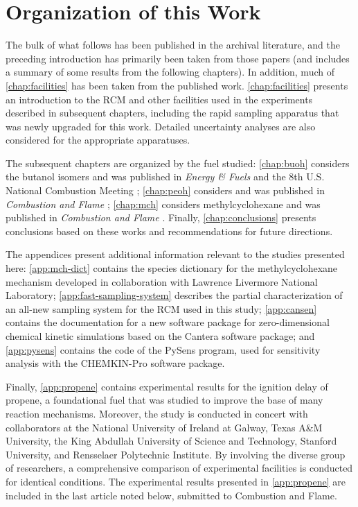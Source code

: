 \documentclass[../main.tex]{subfiles}
\begin{document}
\section{Organization of this Work}

The bulk of what follows has been published in the archival literature,
and the preceding introduction has primarily been taken from those
papers (and includes a summary of some results from the following
chapters). In addition, much of \cref{chap:facilities} has been
taken from the published work. \cref{chap:facilities} presents an
introduction to the RCM and other facilities used in the experiments
described in subsequent chapters, including the rapid sampling apparatus
that was newly upgraded for this work. Detailed uncertainty analyses
are also considered for the appropriate apparatuses.

The subsequent chapters are organized by the fuel studied:
\cref{chap:buoh} considers the butanol isomers and was published in
\textit{Energy \& Fuels} \cite{Weber2013} and the 8th U.S. National
Combustion Meeting \cite{Weber2013a}; \cref{chap:peoh} considers
\iPeOH{} and was published in \textit{Combustion and Flame}
\cite{Sarathy2013}; \cref{chap:mch} considers methylcyclohexane and was
published in \textit{Combustion and Flame} \cite{Weber2014}. Finally,
\cref{chap:conclusions} presents conclusions based on these works and
recommendations for future directions.

The appendices present additional information relevant to the studies
presented here: \cref{app:mch-dict} contains the species dictionary for
the methylcyclohexane mechanism developed in collaboration with Lawrence
Livermore National Laboratory; \cref{app:fast-sampling-system} describes
the partial characterization of an all-new sampling system for the RCM
used in this study; \cref{app:cansen} contains the documentation for a
new software package for zero-dimensional chemical kinetic simulations
based on the Cantera software package; and \cref{app:pysens} contains the code
of the PySens program, used for sensitivity analysis with the CHEMKIN-Pro
software package.

Finally, \cref{app:propene} contains experimental results for the
ignition delay of propene, a foundational fuel that was studied to improve
the base of many reaction mechanisms. Moreover, the study is conducted in concert with
collaborators at the National University of Ireland at Galway, Texas A\&M
University, the King Abdullah University of Science and Technology,
Stanford University, and Rensselaer Polytechnic Institute. By involving
the diverse group of researchers, a comprehensive comparison of experimental
facilities is conducted for identical conditions. The experimental results
presented in \cref{app:propene} are included in the last article noted
below, submitted to Combustion and Flame.
\end{document}
